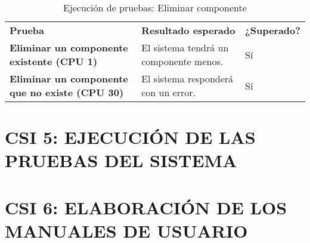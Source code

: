 \begin{table}[H]
\vspace{-4mm}
  \centering
  \caption{Ejecución de pruebas: Eliminar componente}
    \begin{tabular}{p{13em}p{18em}p{5em}}
    \toprule
    \rowcolor[rgb]{ .851,  .886,  .953} \multicolumn{3}{p{36em}}{\textbf{Eliminar componente}} \\ \midrule
    \rowcolor[rgb]{ .949,  .949,  .949} \textbf{Prueba} & \textbf{Resultado esperado} & \textbf{¿Superado?} \\ \midrule
    \textbf{Eliminar un componente existente (CPU 1)} & El sistema tendrá un componente menos.  & Sí  \\ \midrule
    \textbf{Eliminar un componente que no existe (CPU 30)} &  El sistema responderá con un error.  & Sí  \\ \bottomrule
    \end{tabular}%
\end{table}%

\newpage
\section{CSI 5: EJECUCIÓN DE LAS PRUEBAS DEL SISTEMA}


%
% 
%
%
%


\newpage
\section{CSI 6: ELABORACIÓN DE LOS MANUALES DE USUARIO}

